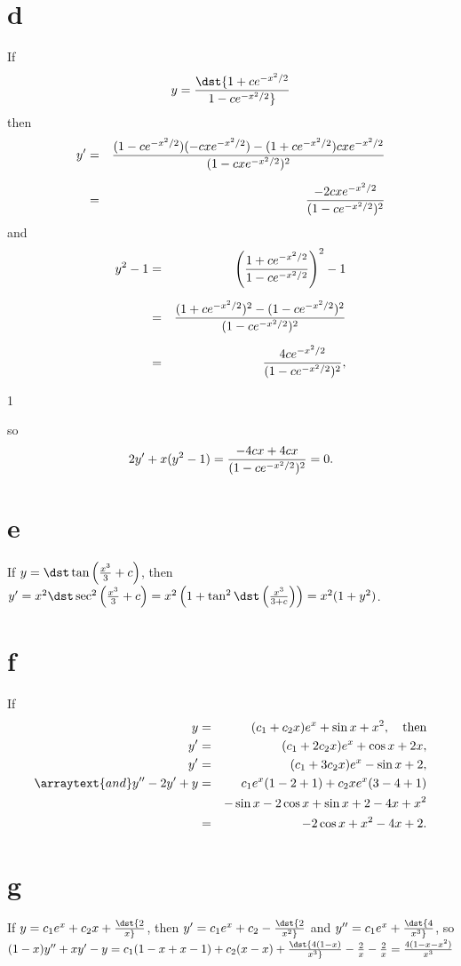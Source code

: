 \documentclass[dvips]{book}
\numberwithin{example}{section}
\numberwithin{equation}{section}
\numberwithin{theorem}{section}
\numberwithin{table}{section}
\numberwithin{figure}{section}
\begin{document}
\part{d}
If
$$
y=\dst{1+ce^{-x^2/2}\over1-ce^{-x^2/2}}
$$
then
\begin{eqnarray*}
y'&=&{(1-ce^{-x^2/2})(-cxe^{-x^2/2})-(1+ce^{-x^2/2})cxe^{-x^2/2}\over
(1-cxe^{-x^2/2})^2}\\[2\jot]
&=&{-2cxe^{-x^2/2}\over(1-ce^{-x^2/2})^2}
\end{eqnarray*}
and
\begin{eqnarray*}
y^2-1&=&\left(1+ce^{-x^2/2}\over1-ce^{-x^2/2}\right)^2-1\\[2\jot]
&=&{(1+ce^{-x^2/2})^2-(1-ce^{-x^2/2})^2\over(1-ce^{-x^2/2})^2}\\[2\jot]
&=&{4ce^{-x^2/2}\over(1-ce^{-x^2/2})^2},
\end{eqnarray*}

\medskip
\centerline{1}


so
$$
2y'+x(y^2-1)={-4cx+4cx\over(1-ce^{-x^2/2})^2}=0.
$$


\part{e}
If $y=\dst\tan\left( {x^3\over3}+c\right)$, then
$y'=x^2\dst\sec^2\left({x^3\over3}+c\right)=
x^2\left(1+\tan^2\dst\left({x^3\over3+c}\right)\right)=
x^2(1+y^2)$.

\part{f}
If
\vspace*{-5ex}
\begin{eqnarray*}
y&=&(c_1+c_2x)e^x+\sin x+x^2,\mbox{\quad then}\\
y'&=&(c_1+2c_2x)e^x+\cos x+2x,\\
y'&=&(c_1+3c_2x)e^x-\sin x+2,\\
\arraytext{and}
y''-2y'+y&=&c_1e^x(1-2+1)+c_2xe^x(3-4+1)\\
&&-\sin x-2\cos x+\sin x+2-4x+x^2\\
&=&-2 \cos x+x^2-4x+2.
\end{eqnarray*}

\part{g} If $y=c_1e^x+c_2x+\dst{2\over x}$, then
$y'=c_1e^x+c_2-\dst{2\over x^2}$ and $y''=c_1e^x+\dst{4\over x^3}$, so
$(1-x)y''+xy'- y=c_1(1-x+x-1)+c_2(x-x)+\dst {4(1-x)\over x^3}-{2\over
x}-{2\over x}= {4(1-x-x^2)\over x^3}$
\end{document}
